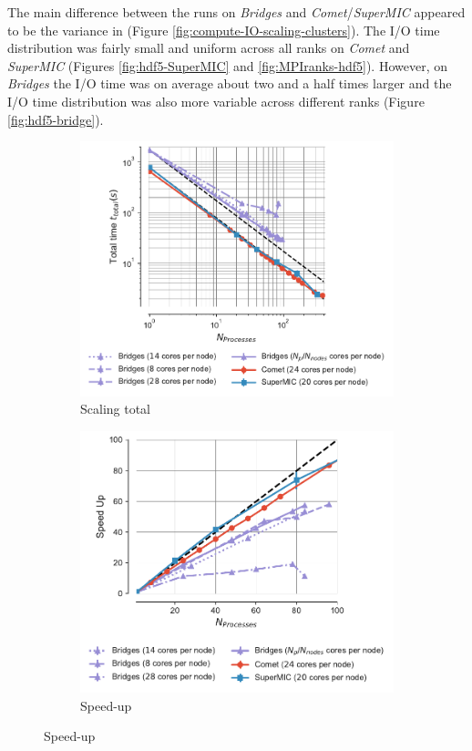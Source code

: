 The main difference between the runs on \emph{Bridges} and \emph{Comet}/\emph{SuperMIC} appeared to be the variance in \tIO (Figure \ref{fig:compute-IO-scaling-clusters}).
The I/O time distribution was fairly small and uniform across all ranks on \emph{Comet} and \emph{SuperMIC} (Figures \ref{fig:hdf5-SuperMIC} and \ref{fig:MPIranks-hdf5}).
However, on \emph{Bridges} the I/O time was on average about two and a half times larger and the I/O time distribution was also more variable across different ranks (Figure \ref{fig:hdf5-bridge}).  

\begin{figure}[ht!]
\centering
\begin{subfigure}{.4\textwidth}
  \includegraphics[width=\linewidth]{figures/Comparison_t-tot-clusters.pdf}
  \caption{Scaling total}
  \label{fig:MPIscaling-clusters}
\end{subfigure}
\hfill
\begin{subfigure}{.4\textwidth}
  \includegraphics[width=\linewidth]{figures/Comparison_speed-up-clusters.pdf}
  \caption{Speed-up}
  \label{fig:MPIspeedup-clusters}
\end{subfigure}
\bigskip


\end{figure}
